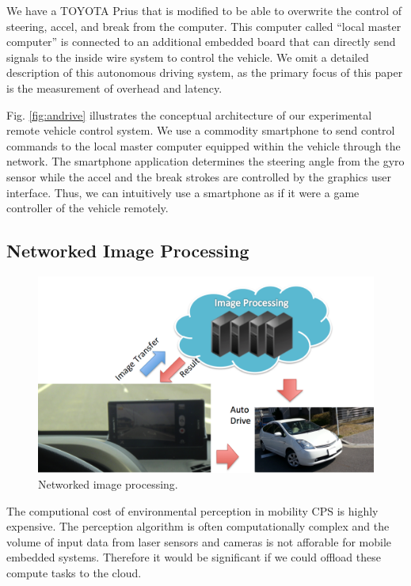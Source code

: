 We have a TOYOTA Prius that is modified to be able to overwrite the
control of steering, accel, and break from the computer.
This computer called ``local master computer'' is connected to an
additional embedded board that can directly send signals to the inside
wire system to control the vehicle.
We omit a detailed description of this autonomous driving system, as the
primary focus of this paper is the measurement of overhead and latency.

Fig. \ref{fig:andrive} illustrates the conceptual architecture of our
experimental remote vehicle control system.
We use a commodity smartphone to send control commands to the local
master computer equipped within the vehicle through the network.
The smartphone application determines the steering angle from the gyro
sensor while the accel and the break strokes are controlled by the
graphics user interface.
Thus, we can intuitively use a smartphone as if it were a game
controller of the vehicle remotely.

\subsection{Networked Image Processing}

\begin{figure}[!t]
 \centering
 \includegraphics[width=\hsize]{fig/TIPIC.pdf}
 \caption{Networked image processing.}
 \label{fig:tipic}
\end{figure}

The computional cost of environmental perception in mobility CPS is
highly expensive.
The perception algorithm is often computationally complex and the volume
of input data from laser sensors and cameras is not afforable for mobile
embedded systems.
Therefore it would be significant if we could offload these compute
tasks to the cloud.


